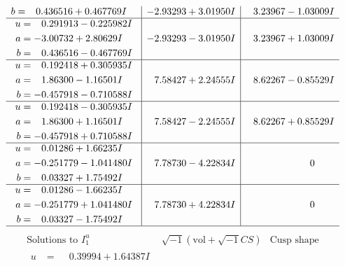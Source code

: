 \documentclass[1p]{elsarticle_modified}
\theoremstyle{definition}
\newcommand{\I}{\sqrt{-1}}
\begin{document}
$$\begin{array}{c|c|c}
\begin{aligned}
b &= \phantom{-}0.436516 + 0.467769 I\end{aligned}
 & -2.93293 + 3.01950 I & \phantom{-}3.23967 - 1.03009 I \\ \hline\begin{aligned}
u &= \phantom{-}0.291913 - 0.225982 I \\
a &= -3.00732 + 2.80629 I \\
b &= \phantom{-}0.436516 - 0.467769 I\end{aligned}
 & -2.93293 - 3.01950 I & \phantom{-}3.23967 + 1.03009 I \\ \hline\begin{aligned}
u &= \phantom{-}0.192418 + 0.305935 I \\
a &= \phantom{-}1.86300 - 1.16501 I \\
b &= -0.457918 - 0.710588 I\end{aligned}
 & \phantom{-}7.58427 + 2.24555 I & \phantom{-}8.62267 - 0.85529 I \\ \hline\begin{aligned}
u &= \phantom{-}0.192418 - 0.305935 I \\
a &= \phantom{-}1.86300 + 1.16501 I \\
b &= -0.457918 + 0.710588 I\end{aligned}
 & \phantom{-}7.58427 - 2.24555 I & \phantom{-}8.62267 + 0.85529 I \\ \hline\begin{aligned}
u &= \phantom{-}0.01286 + 1.66235 I \\
a &= -0.251779 - 1.041480 I \\
b &= \phantom{-}0.03327 + 1.75492 I\end{aligned}
 & \phantom{-}7.78730 - 4.22834 I & \phantom{-0.000000 } 0 \\ \hline\begin{aligned}
u &= \phantom{-}0.01286 - 1.66235 I \\
a &= -0.251779 + 1.041480 I \\
b &= \phantom{-}0.03327 - 1.75492 I\end{aligned}
 & \phantom{-}7.78730 + 4.22834 I & \phantom{-0.000000 } 0\\
 \hline 
 \end{array}$$\newpage$$\begin{array}{c|c|c}  
\text{Solutions to }I^u_{1}& \I (\text{vol} + \sqrt{-1}CS) & \text{Cusp shape}\\
 \hline 
\begin{aligned}
u &= \phantom{-}0.39994 + 1.64387 I \\

\end{aligned}
\end{array}$$
\end{document}

